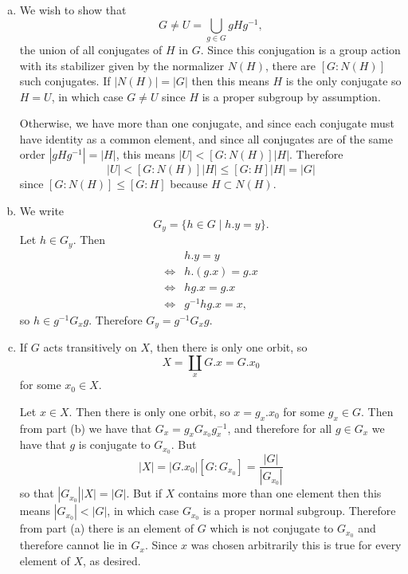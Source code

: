 \documentclass{article}
\begin{document}
\begin{Answer}
  \begin{enumerate}[(a)]
    \item{
      We wish to show that
      $$
      G \neq U = \bigcup_{g \in G} g H g^{-1},
      $$
      the union of all conjugates of $H$ in $G$. Since this conjugation is
      a group action with its stabilizer given by the normalizer
      $N(H)$, there are $[G : N(H)]$ such conjugates. If $|N(H)| = |G|$
      then this means $H$ is the only conjugate so $H = U$, in which
      case $G \neq U$ since $H$ is a proper subgroup by assumption.

      Otherwise, we have more than one conjugate, and since each
      conjugate must have identity as a common element, and since all
      conjugates are of the same order $|g H g^{-1}| = |H|$, this means
      $|U| < [G : N(H)]|H|$. Therefore
      $$
      |U| < [G : N(H)]|H| \leq [G : H] |H| = |G|
      $$
      since $[G : N(H)] \leq [G : H]$ because $H \subset N(H)$.
    }
    \item{
      We write
      $$
      G_y = \{ h \in G \mid h . y = y \}.
      $$
      Let $h \in G_y$. Then
      \begin{align*}
           & h . y = y \\
      \iff & h . (g . x) = g . x \\
      \iff & h g . x = g . x \\
      \iff & g^{-1} h g . x = x,
      \end{align*}
      so $h \in g^{-1} G_x g$. Therefore $G_y = g^{-1} G_x g$.
    }
    \item{
      If $G$ acts transitively on $X$, then there is only one orbit,
      so
      $$
      X = \coprod_x G . x = G . x_0
      $$
      for some $x_0 \in X$.

      Let $x \in X$. Then there is only one orbit, so
      $x = g_x . x_0$ for some $g_x \in G$. Then from part (b) we have
      that $G_x = g_x G_{x_0} g_x^{-1}$, and therefore for all $g \in
      G_x$ we have that $g$ is conjugate to $G_{x_0}$. But
      $$
      |X| = |G . x_0|[G : G_{x_0}] = \frac{|G|}{|G_{x_0}|}
      $$
      so that $|G_{x_0}| |X| = |G|$. But if $X$ contains more than one
      element then this means $|G_{x_0}| < |G|$, in which case
      $G_{x_0}$ is a proper normal subgroup. Therefore from part (a)
      there is an element of $G$ which is not conjugate to $G_{x_0}$
      and therefore cannot lie in $G_x$. Since $x$ was chosen
      arbitrarily this is true for every element of $X$, as desired.
    }
  \end{enumerate}
\end{Answer}
\end{document}
